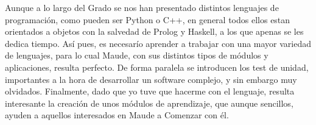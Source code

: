 
Aunque a lo largo del Grado se nos han presentado distintos lenguajes de programación, como pueden ser Python o C++, en general todos ellos estan orientados a objetos con la salvedad de Prolog y Haskell, a los que apenas se les dedica tiempo. Así pues, es necesarío aprender a trabajar con una mayor variedad de lenguajes, para lo cual Maude, con sus distintos tipos de módulos y aplicaciones, resulta perfecto. De forma paralela se introducen los test de unidad, importantes a la hora de desarrollar un software complejo, y sin embargo muy olvidados. Finalmente, dado que yo tuve que hacerme con el lenguaje, resulta interesante la creación de unos módulos de aprendizaje, que aunque sencillos, ayuden a aquellos interesados en Maude a Comenzar con él. \\


